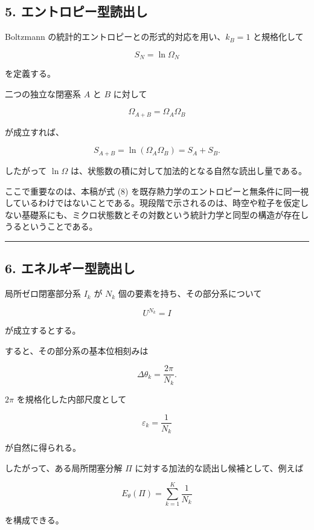 \documentclass[
  a4paper,
]{ltjsarticle}
\begin{document}
\subsection{5.
エントロピー型読出し}\label{ux30a8ux30f3ux30c8ux30edux30d4ux30fcux578bux8aadux51faux3057}

Boltzmann の統計的エントロピーとの形式的対応を用い、\(k_B=1\)
と規格化して

\[
S_N=\ln\Omega_N
\tag{8}
\]

を定義する。

二つの独立な閉塞系 \(A\) と \(B\) に対して

\[
\Omega_{A+B}
=
\Omega_A\Omega_B
\]

が成立すれば、

\[
S_{A+B}
=
\ln(\Omega_A\Omega_B)
=
S_A+S_B.
\tag{9}
\]

したがって \(\ln\Omega\)
は、状態数の積に対して加法的となる自然な読出し量である。

ここで重要なのは、本稿が式 (8)
を既存熱力学のエントロピーと無条件に同一視しているわけではないことである。現段階で示されるのは、時空や粒子を仮定しない基礎系にも、ミクロ状態数とその対数という統計力学と同型の構造が存在しうるということである。

\begin{center}\rule{0.5\linewidth}{0.5pt}\end{center}

\subsection{6.
エネルギー型読出し}\label{ux30a8ux30cdux30ebux30aeux30fcux578bux8aadux51faux3057}

局所ゼロ閉塞部分系 \(I_k\) が \(N_k\) 個の要素を持ち、その部分系について

\[
U^{N_k}=I
\]

が成立するとする。

すると、その部分系の基本位相刻みは

\[
\Delta\theta_k
=
\frac{2\pi}{N_k}.
\tag{10}
\]

\(2\pi\) を規格化した内部尺度として

\[
\varepsilon_k
=
\frac{1}{N_k}
\tag{11}
\]

が自然に得られる。

したがって、ある局所閉塞分解 \(\Pi\)
に対する加法的な読出し候補として、例えば

\[
E_{\theta}(\Pi)
=
\sum_{k=1}^{K}\frac{1}{N_k}
\tag{12}
\]

を構成できる。
\end{document}
